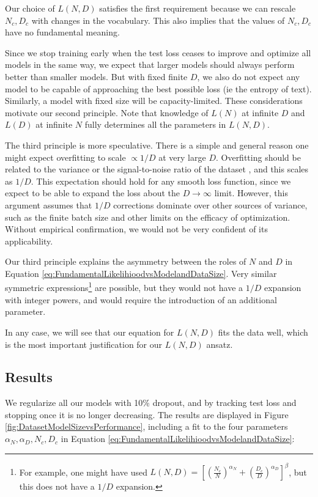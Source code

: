 Our choice of $L(N,D)$ satisfies the first requirement because we can rescale $N_c, D_c$ with changes in the vocabulary.  This also implies that the values of $N_c, D_c$ have no fundamental meaning.

Since we stop training early when the test loss ceases to improve and optimize all models in the same way, we expect that larger models should always perform better than smaller models.  But with fixed finite $D$, we also do not expect any model to be capable of approaching the best possible loss (ie the entropy of text).  Similarly, a model with fixed size will be capacity-limited.  These considerations motivate our second principle. Note that knowledge of $L(N)$ at infinite $D$ and $L(D)$ at infinite $N$ fully determines all the parameters in $L(N,D)$.

The third principle is more speculative.  There is a simple and general reason one might expect overfitting to scale $\propto 1/D$ at very large $D$.  Overfitting should be related to the variance or the signal-to-noise ratio of the dataset \cite{1710.03667}, and this scales as $1/D$.  This expectation should hold for any smooth loss function, since we expect to be able to expand the loss about the $D \to \infty$ limit.   However, this argument assumes that $1/D$ corrections dominate over other sources of variance, such as the finite batch size and  other limits on the efficacy of optimization.  Without empirical confirmation, we would not be very confident of its applicability.

Our third principle explains the asymmetry between the roles of $N$ and $D$ in Equation \eqref{eq:FundamentalLikelihioodvsModelandDataSize}.  Very similar symmetric expressions\footnote{For example, one might have used $L(N,D) =  \left[ \left( \frac{N_c}{N} \right)^{\alpha_N} + \left( \frac{D_c}{D} \right)^{\alpha_D}  \right]^\beta$, but this does not  have a $1/D$ expansion.} are possible, but they would not have a $1/D$ expansion with integer powers, and would require the introduction of an additional parameter.

In any case, we will see that our equation for $L(N,D)$ fits the data  well, which is the most important justification for our $L(N,D)$ ansatz.

\subsection{Results}

We regularize all our models with 10\% dropout, and by tracking test loss and stopping once it is no longer decreasing.   The results are displayed in Figure \ref{fig:DatasetModelSizevsPerformance}, including a fit to the four parameters $\alpha_N, \alpha_D, N_c, D_c$ in Equation \eqref{eq:FundamentalLikelihioodvsModelandDataSize}:

